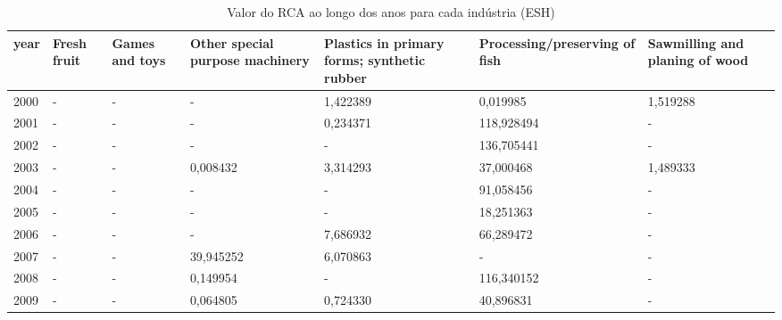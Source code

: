 \begin{table}
\centering
\caption{Valor do RCA ao longo dos anos para cada indústria (ESH)}
\begin{tabular}{p{1cm}p{2cm}p{2cm}p{2cm}p{2cm}p{2cm}p{2cm}}
\toprule
 year &  Fresh fruit &  Games and toys &  Other special purpose machinery &  Plastics in primary forms; synthetic rubber &  Processing/preserving of fish &  Sawmilling and planing of wood \\
\midrule
 2000 &            - &               - &                                - &                                     1,422389 &                       0,019985 &                        1,519288 \\
 2001 &            - &               - &                                - &                                     0,234371 &                     118,928494 &                               - \\
 2002 &            - &               - &                                - &                                            - &                     136,705441 &                               - \\
 2003 &            - &               - &                         0,008432 &                                     3,314293 &                      37,000468 &                        1,489333 \\
 2004 &            - &               - &                                - &                                            - &                      91,058456 &                               - \\
 2005 &            - &               - &                                - &                                            - &                      18,251363 &                               - \\
 2006 &            - &               - &                                - &                                     7,686932 &                      66,289472 &                               - \\
 2007 &            - &               - &                        39,945252 &                                     6,070863 &                              - &                               - \\
 2008 &            - &               - &                         0,149954 &                                            - &                     116,340152 &                               - \\
 2009 &            - &               - &                         0,064805 &                                     0,724330 &                      40,896831 &                               - \\

\end{tabular}
\end{table}

